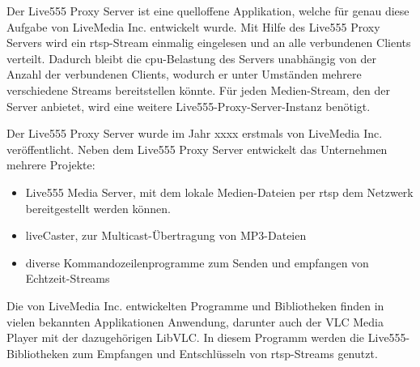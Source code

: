 Der Live555 Proxy Server ist eine quelloffene Applikation, welche für genau diese Aufgabe von LiveMedia Inc. entwickelt wurde.
Mit Hilfe des Live555 Proxy Servers wird ein \acs{rtsp}-Stream einmalig eingelesen und an alle verbundenen Clients verteilt.
Dadurch bleibt die \acs{cpu}-Belastung des Servers unabhängig von der Anzahl der verbundenen Clients, wodurch er unter Umständen mehrere verschiedene Streams bereitstellen könnte. Für jeden Medien-Stream, den der Server anbietet, wird eine weitere Live555-Proxy-Server-Instanz benötigt.\par

Der Live555 Proxy Server wurde im Jahr xxxx erstmals von LiveMedia Inc. veröffentlicht. Neben dem Live555 Proxy Server entwickelt das Unternehmen mehrere Projekte:
\begin{itemize}
    \item Live555 Media Server, mit dem lokale Medien-Dateien per \acs{rtsp} dem Netzwerk bereitgestellt werden können.
    \item liveCaster, zur Multicast-Übertragung von MP3-Dateien
    \item diverse Kommandozeilenprogramme zum Senden und empfangen von Echtzeit-Streams
\end{itemize}
Die von LiveMedia Inc. entwickelten Programme und Bibliotheken finden in vielen bekannten Applikationen Anwendung, darunter auch der VLC Media Player mit der dazugehörigen LibVLC. In diesem Programm werden die Live555-Bibliotheken zum Empfangen und Entschlüsseln von \acs{rtsp}-Streams genutzt.